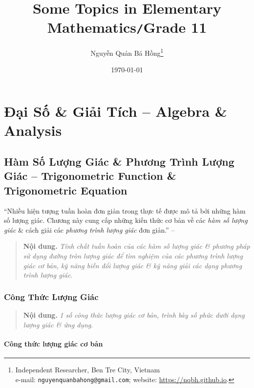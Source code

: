 \documentclass[oneside]{book}
\title{Some Topics in Elementary Mathematics\texttt{/}Grade 11}
\author{Nguyễn Quản Bá Hồng\footnote{Independent Researcher, Ben Tre City, Vietnam\\e-mail: \texttt{nguyenquanbahong@gmail.com}; website: \url{https://nqbh.github.io}.}}
\date{\today}
\numberwithin{equation}{section}
\begin{document}
\frontmatter
\maketitle
\setcounter{secnumdepth}{4}
\setcounter{tocdepth}{3}
\tableofcontents
\newpage


\mainmatter

\part{Đại Số \& Giải Tích -- Algebra \& Analysis}

\chapter{Hàm Số Lượng Giác \& Phương Trình Lượng Giác -- Trigonometric Function \& Trigonometric Equation}

``Nhiều hiện tượng tuần hoàn đơn giản trong thực tế được mô tả bởi những hàm số lượng giác. Chương này cung cấp những kiến thức cơ bản về các \textit{hàm số lượng giác} \& cách giải các \textit{phương trình lượng giác} đơn giản.'' -- \cite[p. 3]{SGK_Toan_11_dai_so_giai_tich_nang_cao}

\begin{quotation}
	\textbf{Nội dung.} \textit{Tính chất tuần hoàn của các hàm số lượng giác \& phương pháp sử dụng đường tròn lượng giác để tìm nghiệm của các phương trình lượng giác cơ bản, kỹ năng biến đổi lượng giác \& kỹ năng giải các dạng phương trình lượng giác}.
\end{quotation}

\section{Công Thức Lượng Giác}

\begin{quotation}
	\textbf{Nội dung.} \textit{1 số công thức lượng giác cơ bản, trình bày số phức dưới dạng lượng giác \& ứng dụng}.
\end{quotation}

\subsection{Công thức lượng giác cơ bản}
\end{document}
